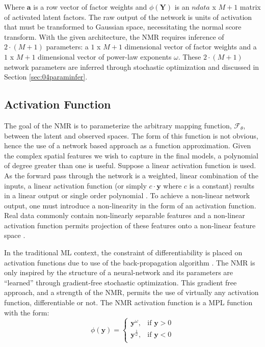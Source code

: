 Where $\mathbf{a}$ is a row vector of factor weights and $\phi\left(\mathbf{Y} \right)$ is an $ndata$ x $M+1$ matrix of activated latent factors. The raw output of the network is units of activation that must be transformed to Gaussian space, necessitating the normal score transform. With the given architecture, the \gls{NMR} requires inference of $2 \cdot (M+1)$ parameters: a $1$ x $M+1$ dimensional vector of factor weights and a $1$ x $M+1$ dimensional vector of power-law exponents $\omega$. These $2 \cdot (M+1)$ network parameters are inferred through stochastic optimization and discussed in Section \ref{sec:04paraminfer}.

\subsection{Activation Function}
\label{subsec:04activation}

The goal of the \gls{NMR} is to parameterize the arbitrary mapping function, $\mathcal{F}_{\theta}$, between the latent and observed spaces. The form of this function is not obvious, hence the use of a network based approach as a function approximation. Given the complex spatial features we wish to capture in the final models, a polynomial of degree greater than one is useful. Suppose a linear activation function is used. As the forward pass through the network is a weighted, linear combination of the inputs, a linear activation function (or simply $c \cdot \mathbf{y}$ where $c$ is a constant) results in a linear output or single order polynomial \citep{sharma2020activation}. To achieve a non-linear network output, one must introduce a non-linearity in the form of an activation function. Real data commonly contain non-linearly separable features and a non-linear activation function permits projection of these features onto a non-linear feature space \citep{dubey2022activation}.

In the traditional \gls{ML} context, the constraint of differentiability is placed on activation functions due to use of the back-propagation algorithm \citep{rojas1996backpropagation}. The \gls{NMR} is only inspired by the structure of a neural-network and its parameters are ``learned'' through gradient-free stochastic optimization. This gradient free approach, and a strength of the \gls{NMR}, permits the use of virtually any activation function, differentiable or not. The \gls{NMR} activation function is a \gls{MPL} function with the form:
\begin{equation}
    \phi \left( \mathbf{y} \right) =
    \begin{cases}
        \mathbf{y}^{\omega},           & \text{if $\mathbf{y} > 0$} \\
        \mathbf{y}^{\frac{1}{\omega}}, & \text{if $\mathbf{y} < 0$} \\
    \end{cases}
    \label{eq:power}
\end{equation}

